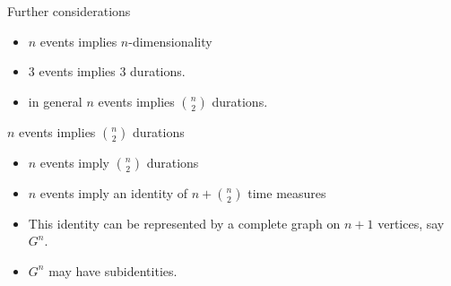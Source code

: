 \documentclass[20pt]{beamer}
\begin{document}

\begin{frame}[plain]
\begin{center}
\Large Further considerations
\begin{itemize}[<+->]
  \item $n$ events implies $n$-dimensionality
  \item 3 events implies 3 durations.
  \item in general $n$ events implies $\binom{n}{2}$ durations.
\end{itemize}
\end{center}
\end{frame}


\begin{frame}[plain]
\begin{center}
\Large $n$ events implies $\binom{n}{2}$ durations


\end{center}
\end{frame}


\begin{frame}[plain]
\begin{center}
\Large
\begin{itemize}[<+->]
  \item $n$ events imply $\binom{n}{2}$ durations
  \item $n$ events imply an identity of $n + \binom{n}{2}$ time measures
  \item This identity can be represented by a complete graph on $n+1$ vertices,
  say $G^n$.
  \item $G^n$ may have subidentities.
\end{itemize}

\end{center}
\end{frame}

\end{document}
